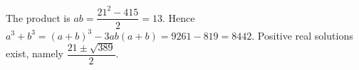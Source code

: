 The product is $ ab=\dfrac{21^2-415}{2}=13 $. Hence $ a^3+b^3=(a+b)^3-3ab(a+b)=9261-819=\boxed{8442}$. Positive real solutions exist, namely $\dfrac{21\pm\sqrt{389}}{2}$.
